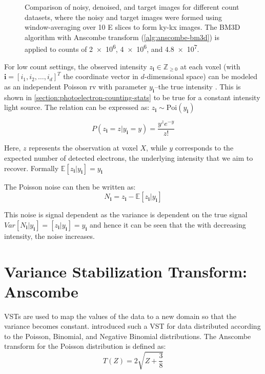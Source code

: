 \begin{figure}
    \caption{Comparison of noisy, denoised, and target images for different count datasets, where the noisy and target images were formed using window-averaging over \num{10} \gls{E} slices to form \gls{ky}-\gls{kx} images. The \gls{BM3D} algorithm with Anscombe transform (\cref{alg:anscombe-bm3d}) is applied to counts of \num{2e6}, \num{4e6}, and \num{4.8e7}.}
    \label{fig:combined-noisy-denoised}
\end{figure}

For low count settings, the observed intensity $z_{\mathbf{i}} \in \mathbb{Z}_{\geq 0}$ at each voxel (with $\mathbf{i} = [i_1, i_2, \dots, i_d]^T$ the coordinate vector in $d$-dimensional space) can be modeled as an independent Poisson \gls{rv} with parameter $y_{\mathbf{i}}$--the true intensity \cite{makitaloOptimalInversionAnscombe2011,kimDeepLearningbasedStatistical2021}. This is shown in \cref{section:photoelectron-counting-stats} to be true for a constant intensity light source. The relation can be expressed as: $z_{\mathbf{i}} \sim \text{Poi}(y_{\mathbf{i}})$

\begin{equation}
    P(z_{\mathbf{i}} = z| y_{\mathbf{i}} = y) = \frac{y^z e^{-y}}{z!}
\end{equation}


Here, $z$ represents the observation at voxel $X$, while $y$ corresponds to the expected number of detected electrons, the underlying intensity that we aim to recover. Formally $\mathbb{E}[z_{\mathbf{i}} | y_{\mathbf{i}}] = y_{\mathbf{i}}$

The Poisson noise can then be written as:
\begin{equation}
    N_{\mathbf{i}} = z_{\mathbf{i}} - \mathbb{E}[z_{\mathbf{i}} | y_{\mathbf{i}}]
\end{equation}

This noise is signal dependent as the variance is dependent on the true signal $Var[N_{\mathbf{i}} | y_{\mathbf{i}}] = [z_{\mathbf{i}} | y_{\mathbf{i}}] = y_{\mathbf{i}}$ and hence it can be seen that the with decreasing intensity, the noise increases.

\section{Variance Stabilization Transform: Anscombe}

\Glspl{VST} are used to map the values of the data to a new domain so that the variance becomes constant. \citeauthor{anscombeTransformationPoissonBinomial1948} \cite{anscombeTransformationPoissonBinomial1948} introduced such a \gls{VST} for data distributed according to the Poisson, Binomial, and Negative Binomial distributions. The Anscombe transform for the Poisson distribution is defined as:
\begin{equation}
    T(Z) = 2 \sqrt{Z + \frac{3}{8}}
\end{equation}

